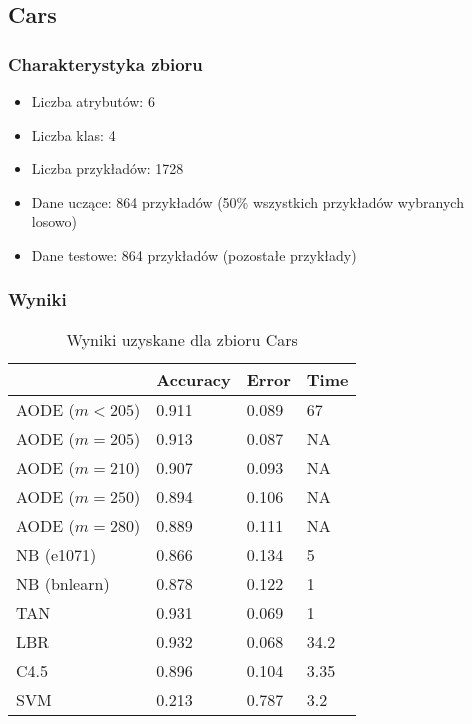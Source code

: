 \documentclass[16]{article}
\begin{document}
\subsection{Cars}
\subsubsection{Charakterystyka zbioru}
\begin{itemize}
	\item Liczba atrybutów: 6
	\item Liczba klas: 4
	\item Liczba przykładów: 1728
	\item Dane uczące: 864 przykładów (50\% wszystkich przykładów wybranych losowo) 
	\item Dane testowe: 864 przykładów (pozostałe przykłady)
\end{itemize}
\subsubsection{Wyniki}
\begin{table}[ht]
\begin{center}
\begin{tabular}{ |l|l|l|l| }
\hline
	 &  Accuracy & Error & Time
 \\ \hline
 AODE ($m < 205$) & 0.911 & 0.089 & 67
 \\ \hline
 AODE ($m = 205$) &  0.913 & 0.087 & NA
 \\ \hline
 AODE ($m = 210$) & 0.907 & 0.093 & NA
 \\ \hline
 AODE ($m = 250$) & 0.894 & 0.106 & NA
 \\ \hline
 AODE ($m = 280$) & 0.889 & 0.111 & NA
 \\ \hline
 NB (e1071) & 0.866 & 0.134 & 5
  \\ \hline
 NB (bnlearn) & 0.878 & 0.122 & 1
 \\ \hline
 TAN & 0.931 & 0.069 & 1
 \\ \hline
 LBR & 0.932 & 0.068 & 34.2
 \\ \hline
 C4.5 & 0.896 & 0.104 & 3.35
 \\ \hline
 SVM & 0.213 & 0.787 & 3.2
 \\ \hline
\end{tabular}\\
\caption{Wyniki uzyskane dla zbioru Cars}
\end{center}
\end{table}
\end{document}
